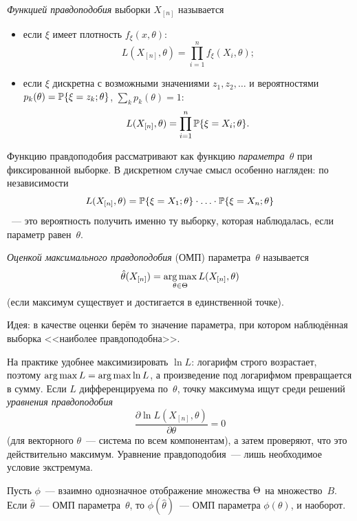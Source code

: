 \begin{definition}
  \emph{Функцией правдоподобия} выборки $X_{[n]}$ называется
  \begin{itemize}
    \item если $\xi$ имеет плотность $f_\xi(x, \theta)$:
          \[
            L(X_{[n]}, \theta) = \prod_{i=1}^n f_\xi(X_i, \theta);
          \]
    \item если $\xi$ дискретна с возможными значениями $z_1, z_2, \ldots$ и вероятностями
          $p_k(\theta) = \P\{\xi = z_k; \theta\}$, $\sum_k p_k(\theta) = 1$:
          \[
            L(X_{[n]}, \theta) = \prod_{i=1}^n \P\{\xi = X_i; \theta\}.
          \]
  \end{itemize}
\end{definition}

Функцию правдоподобия рассматривают как функцию \emph{параметра}~$\theta$ при фиксированной
выборке. В дискретном случае смысл особенно нагляден: по независимости
\[
  L(X_{[n]}, \theta) = \P\{\xi = X_1; \theta\} \cdot \ldots \cdot \P\{\xi = X_n; \theta\}
\]
~--- это вероятность получить именно ту выборку, которая наблюдалась, если параметр
равен~$\theta$.

\begin{definition}
  \emph{Оценкой максимального правдоподобия} (ОМП) параметра~$\theta$ называется
  \[
    \hat\theta(X_{[n]}) = \argmax_{\theta \in \Th} L(X_{[n]}, \theta)
  \]
  (если максимум существует и достигается в единственной точке).
\end{definition}

Идея: в качестве оценки берём то значение параметра, при котором наблюдённая выборка
<<наиболее правдоподобна>>.

На практике удобнее максимизировать $\ln L$: логарифм строго возрастает, поэтому
$\argmax L = \argmax \ln L$, а произведение под логарифмом превращается в сумму.
Если $L$ дифференцируема по~$\theta$, точку максимума ищут среди решений \emph{уравнения
правдоподобия}
\[
  \frac{\partial \ln L(X_{[n]}, \theta)}{\partial \theta} = 0
\]
(для векторного $\theta$~--- система по всем компонентам), а затем проверяют, что это
действительно максимум. Уравнение правдоподобия~--- лишь необходимое условие
экстремума.

\begin{proposition}
  \label{lec07:invariance}
  Пусть $\phi$~--- взаимно однозначное отображение множества $\Th$ на множество~$B$.
  Если $\hat\theta$~--- ОМП параметра~$\theta$, то $\phi(\hat\theta)$~--- ОМП параметра
  $\phi(\theta)$, и наоборот.
\end{proposition}


